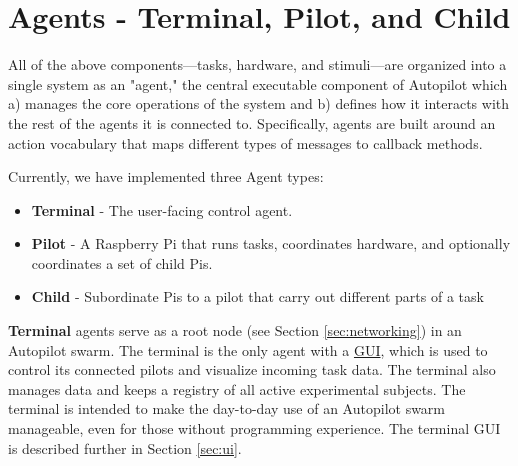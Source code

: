 
\section{Agents - Terminal, Pilot, and Child}
\label{sec:agents}

All of the above components---tasks, hardware, and stimuli---are organized into a single system as an "agent," the central executable component of Autopilot which a) manages the core operations of the system and b) defines how it interacts with the rest of the agents it is connected to. Specifically, agents are built around an action vocabulary that  maps different types of messages to callback methods.

\clearpage

Currently, we have implemented three Agent types: 

\begin{itemize}
    \item \textbf{Terminal} - The user-facing control agent.
    \item \textbf{Pilot} - A Raspberry Pi that runs tasks, coordinates hardware, and optionally coordinates a set of child Pis.
    \item \textbf{Child} - Subordinate Pis to a pilot that carry out different parts of a task
\end{itemize}

\textbf{Terminal} agents serve as a root node (see Section \ref{sec:networking}) in an Autopilot swarm. The terminal is the only agent with a \hyperref[sec:ui]{GUI}, which is used to control its connected pilots and visualize incoming task data. The terminal also manages data and keeps a registry of all active experimental subjects. The terminal is intended to make the day-to-day use of an Autopilot swarm manageable, even for those without programming experience. The terminal GUI is described further in Section \ref{sec:ui}.

